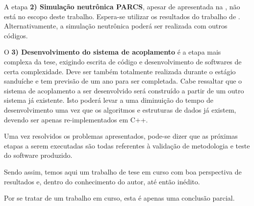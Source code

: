 \documentclass[12pt,openright,twoside,a4paper,english,french,spanish,brazil]{abntex2}
\begin{document}
A etapa \textbf{2) Simulação neutrônica PARCS}, apesar de apresentada na , não está no 
escopo deste trabalho. Espera-se utilizar os resultados do trabalho de \cite{Reis2013}. Alternativamente, 
a simulação neutrônica poderá ser realizada com outros códigos.

O \textbf{3) Desenvolvimento do sistema de acoplamento} é a etapa mais complexa da tese, exigindo escrita de código 
e desenvolvimento de softwares de certa complexidade. Deve ser também totalmente realizada durante o estágio sanduíche 
e tem previsão de um ano para ser completada. Cabe ressaltar que o sistema de acoplamento a ser desenvolvido será 
construído a partir de um outro sistema já existente. Isto poderá levar a uma diminuição do tempo de desenvolvimento uma vez que os algoritmos e 
estruturas de dados já existem, devendo ser apenas re-implementados em C++.

Uma vez resolvidos os problemas apresentados, pode-se dizer que as próximas etapas a serem executadas são todas referentes 
à validação de metodologia e teste do software produzido.

Sendo assim, temos aqui um trabalho de tese em curso com boa perspectiva de resultados e, dentro do conhecimento do autor, 
até então inédito.

Por se tratar de um trabalho em curso, esta é apenas uma conclusão parcial. 

\postextual




%
%


\end{document}
